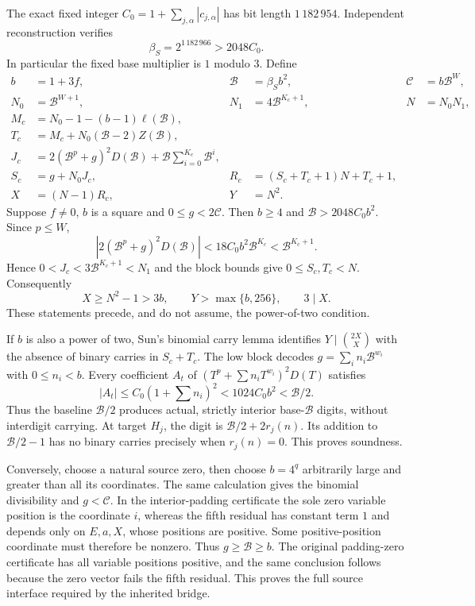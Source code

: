 The exact fixed integer
$C_0=1+\sum_{j,\alpha}|c_{j,\alpha}|$ has bit length $1\,182\,954$.
Independent reconstruction verifies
\[
 \beta_S=2^{1\,182\,966}>2048C_0.
\]
In particular the fixed base multiplier is $1$ modulo $3$.
Define
\begin{align*}
 b&=1+3f,& \mathcal B&=\beta_Sb^2,& \mathcal C&=b\mathcal B^W,\\
 N_0&=\mathcal B^{W+1},&N_1&=4\mathcal B^{K_c+1},&N&=N_0N_1,\\
 M_c&=N_0-1-(b-1)\ell(\mathcal B),\\
 T_c&=M_c+N_0(\mathcal B-2)Z(\mathcal B),\\
 J_c&=2(\mathcal B^p+g)^2D(\mathcal B)
            +\mathcal B\sum_{i=0}^{K_c}\mathcal B^i,\\
 S_c&=g+N_0J_c,&R_c&=(S_c+T_c+1)N+T_c+1,\\
 X&=(N-1)R_c,&Y&=N^2.
\end{align*}
Suppose $f\ne0$, $b$ is a square and $0\le g<2\mathcal C$.
Then $b\ge4$ and $\mathcal B>2048C_0b^2$. Since $p\le W$,
\[
 \left|2(\mathcal B^p+g)^2D(\mathcal B)\right|
 <18C_0b^2\mathcal B^{K_c}<\mathcal B^{K_c+1}.
\]
Hence $0<J_c<3\mathcal B^{K_c+1}<N_1$ and the block bounds give
$0\le S_c,T_c<N$. Consequently
\[
 X\ge N^2-1>3b,\qquad Y>\max\{b,256\},\qquad 3\mid X.
\]
These statements precede, and do not assume, the power-of-two condition.

If $b$ is also a power of two, Sun's binomial carry lemma identifies
$Y\mid\binom{2X}{X}$ with the absence of binary carries in $S_c+T_c$.
The low block decodes
$g=\sum_i n_i\mathcal B^{w_i}$ with $0\le n_i<b$.
Every coefficient $A_t$ of
$(T^p+\sum n_iT^{w_i})^2D(T)$ satisfies
\[
 |A_t|\le C_0(1+\textstyle\sum n_i)^2
 <1024C_0b^2<\mathcal B/2.
\]
Thus the baseline $\mathcal B/2$ produces actual, strictly interior
base-$\mathcal B$ digits, without interdigit carrying. At target $H_j$,
the digit is $\mathcal B/2+2r_j(n)$. Its addition to
$\mathcal B/2-1$ has no binary carries precisely when $r_j(n)=0$.
This proves soundness.

Conversely, choose a natural source zero, then choose $b=4^q$ arbitrarily
large and greater than all its coordinates.  The same calculation gives
the binomial divisibility and $g<\mathcal C$. In the interior-padding
certificate the sole zero variable position is the coordinate $i$,
whereas the fifth residual has constant term $1$ and depends only on
$E,a,X$, whose positions are positive. Some positive-position coordinate
must therefore be nonzero. Thus $g\ge\mathcal B\ge b$. The original
padding-zero certificate has all variable positions positive, and the
same conclusion follows because the zero vector fails the fifth residual.
This proves the full source interface required by the inherited bridge.

